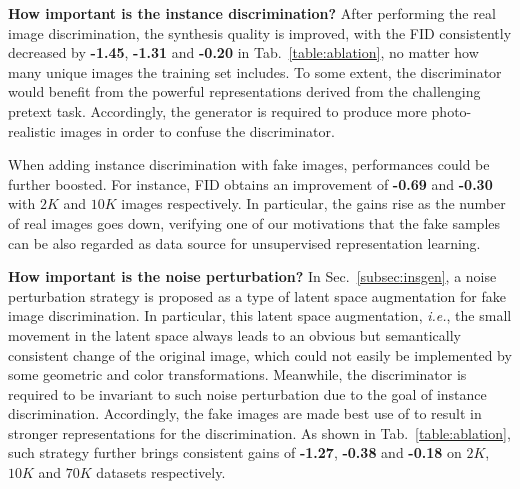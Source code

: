 \documentclass{article}
\begin{document}
\noindent\textbf{How important is the instance discrimination?}
After performing the real image discrimination, the synthesis quality is improved, with the FID consistently decreased by \textbf{-1.45}, \textbf{-1.31} and \textbf{-0.20} in Tab.~\ref{table:ablation}, no matter how many unique images the training set includes. To some extent, the discriminator would benefit from the powerful representations derived from the challenging pretext task. Accordingly, the generator is required to produce more photo-realistic images in order to confuse the discriminator.


When adding instance discrimination with fake images, performances could be further boosted. For instance, FID obtains an improvement of  \textbf{-0.69} and \textbf{-0.30} with $2K$ and $10K$ images respectively. In particular, the gains rise as the number of real images goes down, verifying one of our motivations that the fake samples can be also regarded as data source for unsupervised representation learning.


\noindent\textbf{How important is the noise perturbation?}
In Sec.~\ref{subsec:insgen}, a noise perturbation strategy is proposed as a type of latent space augmentation for fake image discrimination. In particular, this latent space augmentation, \textit{i.e.}, the small movement in the latent space always leads to an obvious but semantically consistent change of the original image, which could not easily be implemented by some geometric and color transformations. Meanwhile, the discriminator is required to be invariant to such noise perturbation due to the goal of instance discrimination. Accordingly, the fake images are made best use of to result in stronger representations for the discrimination. As shown in Tab.~\ref{table:ablation}, such strategy further brings consistent gains of \textbf{-1.27}, \textbf{-0.38} and \textbf{-0.18} on $2K$, $10K$ and $70K$ datasets respectively.
\end{document}

